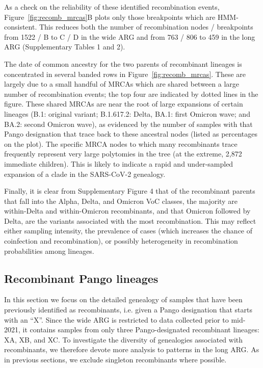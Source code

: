 \documentclass{article}
\begin{document}
As a check on the reliability of these identified recombination events,
Figure~\ref{fig:recomb_mrcas}B  plots only those breakpoints which are
HMM-consistent. This reduces both the number of recombination nodes /
breakpoints from 1522 / B to C / D in the wide ARG and from 763 / 806 to 459 in
the long ARG (Supplementary Tables 1 and 2).

The date of common ancestry for the two parents of recombinant lineages is
concentrated in several banded rows in Figure~\ref{fig:recomb_mrcas}. These are
largely due to a small handful of MRCAs which are shared between a large number
of recombination events; the top four are indicated by dotted lines in the
figure. These shared MRCAs are near the root of large expansions of certain
lineages (B.1: original variant;  B.1.617.2: Delta, BA.1: first Omicron wave;
and BA.2: second Omicron wave), as evidenced by the number of samples with that
Pango designation that trace back to these ancestral nodes (listed as
percentages on the plot). The specific MRCA nodes to which many recombinants
trace frequently represent very large polytomies in the tree (at the extreme,
2,872 immediate children). This is likely to indicate a rapid and under-sampled
expansion of a clade in the SARS-CoV-2 genealogy.

Finally, it is clear from Supplementary Figure 4 that of the recombinant
parents that fall into the Alpha, Delta, and Omicron VoC classes, the majority
are within-Delta and within-Omicron recombinants, and that Omicron followed by
Delta, are the variants associated with the most recombination. This may
reflect either sampling intensity, the prevalence of cases (which increases the
chance of coinfection and recombination), or possibly heterogeneity in
recombination probabilities among lineages.

\subsection{Recombinant Pango lineages}
\label{sec:pango_x_lineages}

In this section we focus on the detailed genealogy of samples that have been
previously identified as recombinants, i.e. given a Pango designation that
starts with an ``X''. Since the wide ARG is restricted to data collected prior
to mid-2021, it contains samples from only three Pango-designated recombinant
lineages: XA, XB, and XC. To investigate the diversity of genealogies
associated with recombinants, we therefore devote more analysis to patterns in
the long ARG. As in previous sections, we exclude singleton recombinants where
possible.
\end{document}
